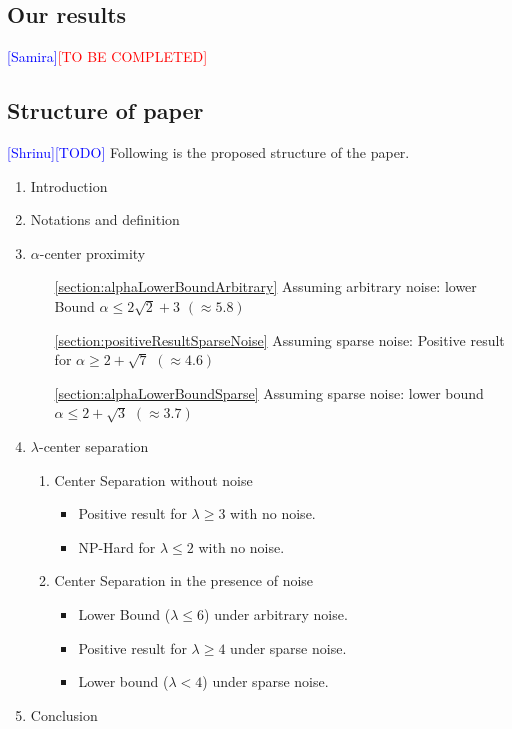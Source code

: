 \documentclass[anon,12pt]{colt2016} %
\newcommand{\todo}{\textcolor{blue}{[TODO]}\xspace}
\newcommand{\complete}{\textcolor{red}{[TO BE COMPLETED]}\xspace}
\newcommand{\samira}{\textcolor{blue}{[Samira]}\xspace}
\newcommand{\shrinu}{\textcolor{blue}{[Shrinu]}\xspace}
\begin{document}
\subsection{Our results}
\samira\complete


\subsection{Structure of paper}
\shrinu\todo Following is the proposed structure of the paper.
\vspace{-0.1in}\begin{enumerate}
\setlength\itemsep{0em}
\item Introduction
\item Notations and definition
\item $\alpha$-center proximity	\vspace{-0.1in}
	\begin{enumerate}[leftmargin=32pt]
	\renewcommand{\labelenumii}{\theenumii}
	\renewcommand{\theenumii}{\theenumi.\arabic{enumii}.}
	\setlength\itemsep{0em}
	\item[\ref{section:alphaLowerBoundArbitrary}] Assuming arbitrary noise: lower Bound $\alpha \le 2\sqrt{2} + 3$ $(\approx 5.8)$
	\item[\ref{section:positiveResultSparseNoise}] Assuming sparse noise: Positive result for $\alpha \ge 2+\sqrt{7}$ $(\approx 4.6)$
	\item[\ref{section:alphaLowerBoundSparse}] Assuming sparse noise: lower bound $\alpha \le 2+\sqrt{3}$ $(\approx 3.7)$
	\end{enumerate}
\item $\lambda$-center separation \vspace{-0.1in}
	\begin{enumerate}[leftmargin=32pt]
	\renewcommand{\labelenumii}{\theenumii}
	\renewcommand{\theenumii}{\theenumi.\arabic{enumii}.}
	\setlength\itemsep{0em}
	\item Center Separation without noise
	\begin{itemize}
	\item Positive result for $\lambda \ge 3$ with no noise.
	\item NP-Hard for $\lambda \le 2$ with no noise.
	\end{itemize}
	\item Center Separation in the presence of noise \begin{itemize}
	\item Lower Bound ($\lambda \le 6$) under arbitrary noise.
	\item Positive result for $\lambda \ge 4$ under sparse noise.
	\item Lower bound ($\lambda < 4$) under sparse noise.
	\end{itemize}
	\end{enumerate}
\item Conclusion
\end{enumerate}
\end{document}
